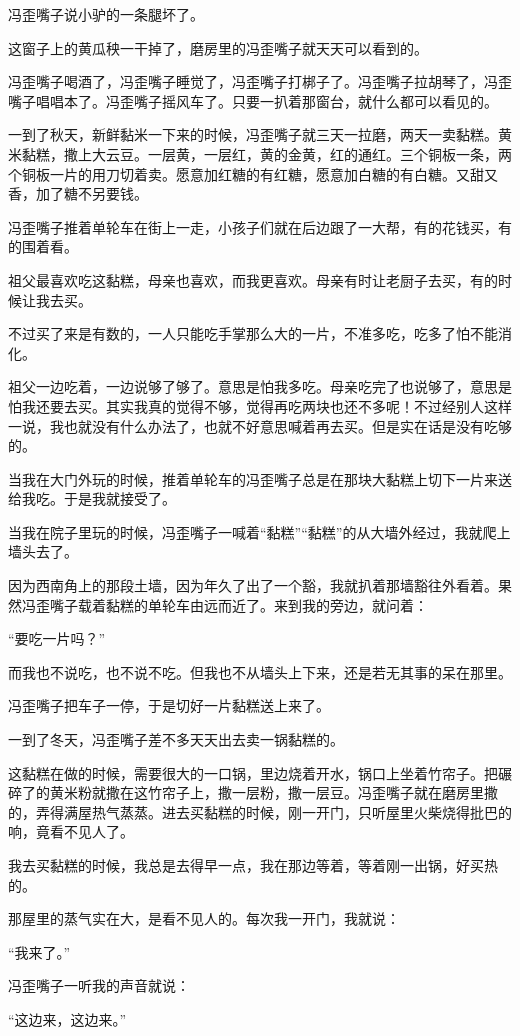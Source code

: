 \par 冯歪嘴子说小驴的一条腿坏了。
\par 这窗子上的黄瓜秧一干掉了，磨房里的冯歪嘴子就天天可以看到的。
\par 冯歪嘴子喝酒了，冯歪嘴子睡觉了，冯歪嘴子打梆子了。冯歪嘴子拉胡琴了，冯歪嘴子唱唱本了。冯歪嘴子摇风车了。只要一扒着那窗台，就什么都可以看见的。
\par 一到了秋天，新鲜黏米一下来的时候，冯歪嘴子就三天一拉磨，两天一卖黏糕。黄米黏糕，撒上大云豆。一层黄，一层红，黄的金黄，红的通红。三个铜板一条，两个铜板一片的用刀切着卖。愿意加红糖的有红糖，愿意加白糖的有白糖。又甜又香，加了糖不另要钱。
\par 冯歪嘴子推着单轮车在街上一走，小孩子们就在后边跟了一大帮，有的花钱买，有的围着看。
\par 祖父最喜欢吃这黏糕，母亲也喜欢，而我更喜欢。母亲有时让老厨子去买，有的时候让我去买。
\par 不过买了来是有数的，一人只能吃手掌那么大的一片，不准多吃，吃多了怕不能消化。
\par 祖父一边吃着，一边说够了够了。意思是怕我多吃。母亲吃完了也说够了，意思是怕我还要去买。其实我真的觉得不够，觉得再吃两块也还不多呢！不过经别人这样一说，我也就没有什么办法了，也就不好意思喊着再去买。但是实在话是没有吃够的。
\par 当我在大门外玩的时候，推着单轮车的冯歪嘴子总是在那块大黏糕上切下一片来送给我吃。于是我就接受了。
\par 当我在院子里玩的时候，冯歪嘴子一喊着“黏糕”“黏糕”的从大墙外经过，我就爬上墙头去了。
\par 因为西南角上的那段土墙，因为年久了出了一个豁，我就扒着那墙豁往外看着。果然冯歪嘴子载着黏糕的单轮车由远而近了。来到我的旁边，就问着：
\par “要吃一片吗？”
\par 而我也不说吃，也不说不吃。但我也不从墙头上下来，还是若无其事的呆在那里。
\par 冯歪嘴子把车子一停，于是切好一片黏糕送上来了。
\par 一到了冬天，冯歪嘴子差不多天天出去卖一锅黏糕的。
\par 这黏糕在做的时候，需要很大的一口锅，里边烧着开水，锅口上坐着竹帘子。把碾碎了的黄米粉就撒在这竹帘子上，撒一层粉，撒一层豆。冯歪嘴子就在磨房里撒的，弄得满屋热气蒸蒸。进去买黏糕的时候，刚一开门，只听屋里火柴烧得批巴的响，竟看不见人了。
\par 我去买黏糕的时候，我总是去得早一点，我在那边等着，等着刚一出锅，好买热的。
\par 那屋里的蒸气实在大，是看不见人的。每次我一开门，我就说：
\par “我来了。”
\par 冯歪嘴子一听我的声音就说：
\par “这边来，这边来。”
